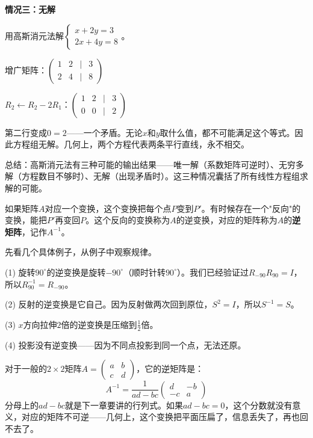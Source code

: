 \vspace{0.2cm}
\noindent\textbf{情况三：无解}

\begin{example}
用高斯消元法解$\begin{cases}x+2y=3\\2x+4y=8\end{cases}$。
\end{example}
\begin{solution}
增广矩阵：$\begin{pmatrix}1 & 2 & | & 3\\2 & 4 & | & 8\end{pmatrix}$

$R_2\leftarrow R_2-2R_1$：$\begin{pmatrix}1 & 2 & | & 3\\0 & 0 & | & 2\end{pmatrix}$

第二行变成$0=2$——一个矛盾。无论$x$和$y$取什么值，都不可能满足这个等式。因此方程组无解。几何上，两个方程代表两条平行直线，永不相交。
\end{solution}

总结：高斯消元法有三种可能的输出结果——唯一解（系数矩阵可逆时）、无穷多解（方程数目不够时）、无解（出现矛盾时）。这三种情况囊括了所有线性方程组求解的可能。


如果矩阵$A$对应一个变换，这个变换把每个点$P$变到$P'$。有时候存在一个"反向"的变换，能把$P'$再变回$P$。这个反向的变换称为$A$的逆变换，对应的矩阵称为$A$的\textbf{逆矩阵}，记作$A^{-1}$。

\begin{example}
先看几个具体例子，从例子中观察规律。
\end{example}

\begin{solution}
(1) 旋转$90^\circ$的逆变换是旋转$-90^\circ$（顺时针转$90^\circ$）。我们已经验证过$R_{-90}R_{90}=I$，所以$R_{90}^{-1}=R_{-90}$。

(2) 反射的逆变换是它自己。因为反射做两次回到原位，$S^2=I$，所以$S^{-1}=S$。

(3) $x$方向拉伸$2$倍的逆变换是压缩到$\frac12$倍。

(4) 投影没有逆变换——因为不同点投影到同一个点，无法还原。
\end{solution}

对于一般的$2\times2$矩阵$A=\begin{pmatrix}a&b\\c&d\end{pmatrix}$，它的逆矩阵是：
\[
A^{-1} = \frac{1}{ad-bc}\begin{pmatrix}d&-b\\-c&a\end{pmatrix}
\]
分母上的$ad-bc$就是下一章要讲的行列式。如果$ad-bc=0$，这个分数就没有意义，对应的矩阵不可逆——几何上，这个变换把平面压扁了，信息丢失了，再也回不去了。

